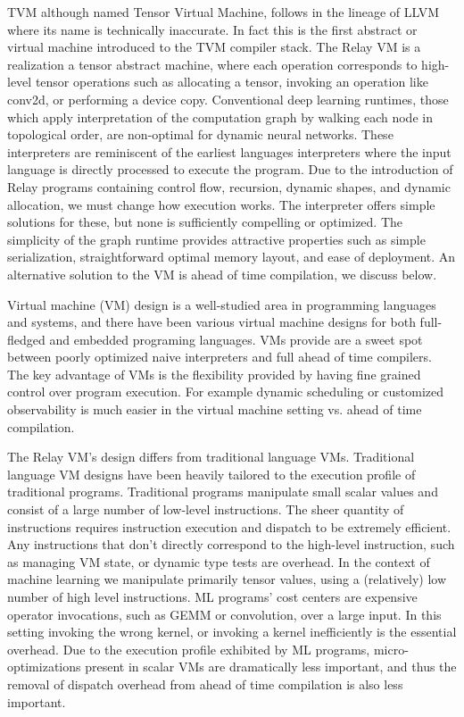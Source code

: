 TVM although named Tensor Virtual Machine, follows in the lineage of LLVM
  where its name is technically inaccurate.
In fact this is the first abstract or virtual machine introduced to the
  TVM compiler stack.
The Relay VM is a realization a tensor abstract machine,
  where each operation corresponds to high-level tensor operations such
  as allocating a tensor, invoking an operation like conv2d, or performing a device copy.
Conventional deep learning runtimes, those which apply interpretation of the
  computation graph by walking each node in topological order, are non-optimal
  for dynamic neural networks.
These interpreters are reminiscent of the earliest
  languages interpreters where the input language is directly
  processed to execute the program.
Due to the introduction of Relay programs containing
  control flow, recursion, dynamic shapes, and dynamic allocation,
  we must change how execution works.
The interpreter offers simple solutions for these,
  but none is sufficiently compelling or optimized.
The simplicity of the graph runtime provides attractive
  properties such as simple serialization, straightforward
  optimal memory layout, and ease of deployment.
An alternative solution to the VM is ahead of time
  compilation, we discuss below.

Virtual machine (VM) design is a
  well-studied area in programming languages and systems,
  and there have been various virtual machine designs
  for both full-fledged and embedded programing languages.
VMs provide are a sweet spot between
  poorly optimized naive interpreters
  and full ahead of time compilers.
The key advantage of VMs is the flexibility provided
  by having fine grained control over program execution.
For example dynamic scheduling or customized observability
  is much easier in the virtual machine setting vs. ahead of time compilation.

The Relay VM's design differs from traditional language VMs.
Traditional language VM designs have been heavily
  tailored to the execution profile of traditional programs.
Traditional programs manipulate small scalar values
  and consist of a large number of low-level instructions.
The sheer quantity of instructions requires instruction execution
  and dispatch to be extremely efficient.
Any instructions that don't directly correspond to the high-level
  instruction, such as managing VM state, or dynamic type tests
  are overhead.
In the context of machine learning we manipulate primarily tensor values,
  using a (relatively) low number of high level instructions.
ML programs’ cost centers are expensive operator invocations,
  such as GEMM or convolution, over a large input.
In this setting invoking the wrong kernel, or invoking a kernel inefficiently
  is the essential overhead.
Due to the execution profile exhibited by ML programs,
  micro-optimizations present in scalar VMs are dramatically less important,
  and thus the removal of dispatch overhead from ahead of time compilation
  is also less important.

